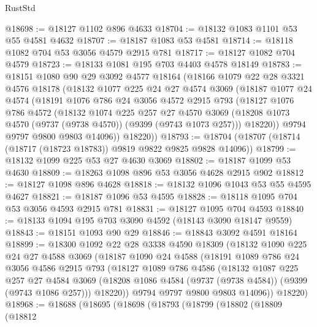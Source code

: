 \begin{lexlean}{RustStd}
\begin{coremodule}
@18698 := @18127 @1102 @896 @4633
@18704 := @18132 @1083 @1101 @53 @55 @4581 @4632
@18707 := @18187 @1083 @53 @4581
@18714 := @18118 @1082 @704 @53 @3056 @4579 @2915 @781
@18717 := @18127 @1082 @704 @4579
@18723 := @18133 @1081 @195 @703 @4403 @4578 @18149
@18783 := @18151
    @1080
    @90
    @29
    @3092
    @4577
    @18164
    (@18166
      @1079
      @22
      @28
      @3321
      @4576
      @18178
      (@18132
        @1077
        @225
        @24
        @27
        @4574
        @3069
        (@18187
          @1077
          @24
          @4574
          (@18191
            @1076
            @786
            @24
            @3056
            @4572
            @2915
            @793
            (@18127
              @1076
              @786
              @4572
              (@18132
                @1074
                @225
                @257
                @27
                @4570
                @3069
                (@18208 @1073 @4570 (@9737 (@9738 @4570)) (@9399 (@9743 @1073 @257)))
                @18220))
            @9794
            @9797
            @9800
            @9803
            @14096))
        @18220))
@18793 := @18704 (@18707 (@18714 (@18717 (@18723 @18783)) @9819 @9822 @9825 @9828 @14096))
@18799 := @18132 @1099 @225 @53 @27 @4630 @3069
@18802 := @18187 @1099 @53 @4630
@18809 := @18263 @1098 @896 @53 @3056 @4628 @2915 @902
@18812 := @18127 @1098 @896 @4628
@18818 := @18132 @1096 @1043 @53 @55 @4595 @4627
@18821 := @18187 @1096 @53 @4595
@18828 := @18118 @1095 @704 @53 @3056 @4593 @2915 @781
@18831 := @18127 @1095 @704 @4593
@18840 := @18133 @1094 @195 @703 @3090 @4592 (@18143 @3090 @18147 @9559)
@18843 := @18151 @1093 @90 @29
@18846 := @18843 @3092 @4591 @18164
@18899 := @18300
    @1092
    @22
    @28
    @3338
    @4590
    @18309
    (@18132
      @1090
      @225
      @24
      @27
      @4588
      @3069
      (@18187
        @1090
        @24
        @4588
        (@18191
          @1089
          @786
          @24
          @3056
          @4586
          @2915
          @793
          (@18127
            @1089
            @786
            @4586
            (@18132
              @1087
              @225
              @257
              @27
              @4584
              @3069
              (@18208 @1086 @4584 (@9737 (@9738 @4584)) (@9399 (@9743 @1086 @257)))
              @18220))
          @9794
          @9797
          @9800
          @9803
          @14096))
      @18220)
@18968 := @18688
    (@18695
      (@18698
        (@18793
          (@18799
            (@18802
              (@18809
                (@18812

\end{coremodule}
\end{lexlean}
